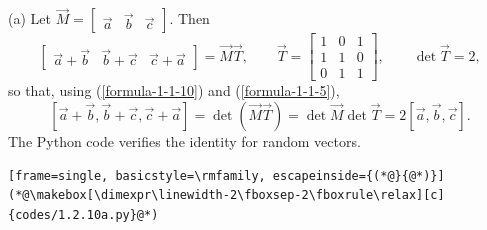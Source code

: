 \begin{enumerate}[label={},font=\normalfont,leftmargin=1.15cm,labelwidth=1.0cm,labelsep=0.15cm,itemindent=0pt,listparindent=0pt,itemsep=\baselineskip,parsep=0pt,topsep=0pt]
(a) Let $\vec{M}=\begin{bmatrix}\vec{a}&\vec{b}&\vec{c}\end{bmatrix}$. Then
\[
\begin{bmatrix}\vec{a}+\vec{b}&\vec{b}+\vec{c}&\vec{c}+\vec{a}\end{bmatrix}=\vec{M}\vec{T},\qquad
\vec{T}=\begin{bmatrix}1&0&1\\1&1&0\\0&1&1\end{bmatrix},\qquad\det\vec{T}=2,
\]
so that, using (\ref{formula-1-1-10}) and (\ref{formula-1-1-5}),
\[
[\vec{a}+\vec{b},\vec{b}+\vec{c},\vec{c}+\vec{a}]=\det(\vec{M}\vec{T})=\det\vec{M}\det\vec{T}=2[\vec{a},\vec{b},\vec{c}].
\]
The Python code verifies the identity for random vectors.
\par\noindent\begin{minipage}{\linewidth}
\begin{lstlisting}[frame=single, basicstyle=\rmfamily, escapeinside={(*@}{@*)}]
(*@\makebox[\dimexpr\linewidth-2\fboxsep-2\fboxrule\relax][c]{codes/1.2.10a.py}@*)
\end{lstlisting}
\end{minipage}\par


\end{enumerate}
